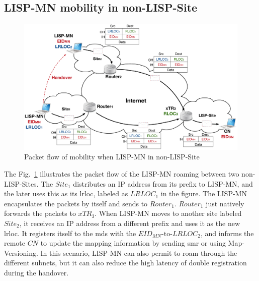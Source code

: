 \subsection{LISP-MN mobility in non-LISP-Site}
\label{subsec:lispMN_NLS}

\begin{figure}[!t]
	\centering
	\includegraphics[width=\textwidth]{Pics/LISP-MN_in_non-LISP-Site.eps}
	\caption{Packet flow of mobility when LISP-MN in non-LISP-Site}
	\label{LISP-MN_in_non-LISP-Site}
\end{figure}
The Fig.~\ref{LISP-MN_in_non-LISP-Site} illustrates the packet flow of the $\text{LISP-MN}$ roaming between two non-LISP-Sites. The $Site_1$ distributes an IP address from its prefix to $\text{LISP-MN}$, and the later uses this as its \acrshort{lrloc}, labeled as $LRLOC_1$ in the figure. The $\text{LISP-MN}$ encapsulates the packets by itself and sends to $Router_1$. $Router_1$ just natively forwards the packets to $xTR_3$. When $\text{LISP-MN}$ moves to another site labeled $Site_2$, it receives an IP address from a different prefix and uses it as the new \acrshort{lrloc}. It registers itself to the \acrshort{mds} with the $EID_{MN}\text{-to-}LRLOC_2$, and informs the remote $CN$ to update the mapping information by sending \acrshort{smr} or using Map-Versioning. In this scenario, $\text{LISP-MN}$ can also permit to roam through the different subnets, but it can also reduce the high latency of double registration during the handover. 


